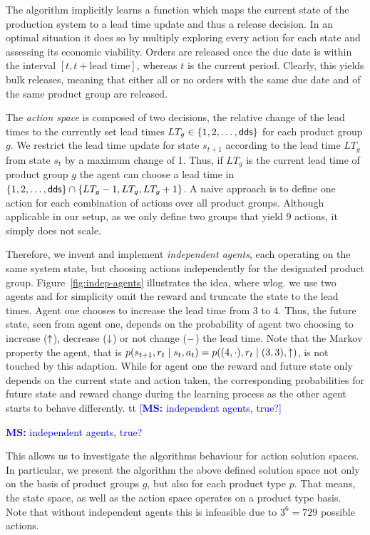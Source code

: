 \documentclass[envcountsame]{llncs}
\newcommand\MS[2][r]{\ifx t#1 \textcolor{blue}{[\textbf{MS:} #2]}
  \else \begin{center}\textcolor{blue}{\textbf{MS:} #2} \end{center} \fi}
\begin{document}
The algorithm implicitly learns a function which maps the current state of the production
system to a lead time update and thus a release decision. In an optimal situation it does so by
multiply exploring every action for each state and assessing its economic viability.
%
Orders are released once the due date is within the interval $[t,t+\text{lead time}]$, whereas $t$
is the current period. Clearly, this yields bulk releases, meaning that either all or no orders with
the same due date and of the same product group are
released.

The \textit{action space} is composed of two decisions, the relative change of the lead times to the
currently set lead times $LT_{g} \in \{1,2,\ldots,\textsf{dds}\}$ for each product group $g$.
%
We restrict the lead time update for state $s_{t+1}$ according to the lead time $LT_{g}$ from state
$s_{t}$ by a maximum change of 1. Thus, if $LT_{g}$ is the current lead time of product group $g$
the agent can choose a lead time in $\{1,2,\ldots,\textsf{dds}\} \cap \{LT_{g}-1,LT_{g},LT_{g}+1\}$. %
A naive approach is to define one action for each combination of actions over all product groups.
Although applicable in our setup, as we only define two groups that yield \(9\) actions, it simply
does not scale.
%
\begin{figure*}[t!]
  \centering
  \caption{Illustration of independent agents as agent one increases the lead time}\label{fig:indep-agents}
\end{figure*}
%
Therefore, we invent and implement \textit{independent agents}, each operating on the same system
state, but choosing actions independently for the designated product group.
Figure~\ref{fig:indep-agents} illustrates the idea, where wlog. we use two agents and for simplicity
omit the reward and truncate the state to the lead times. Agent one chooses to increase the lead
time from \(3\) to \(4\). Thus, the future state, seen from agent one, depends on the probability of
agent two choosing to increase (\(\uparrow\)), decrease (\(\downarrow\)) or not change (\(-\)) the lead
time. Note that the Markov property the agent, that is
\(p(s_{t+1}, r_{t} \mid s_{t}, a_{t}) = p((4,\cdot), r_{t} \mid (3,3), \uparrow) \), is not touched by
this adaption. While for agent one the reward and future state only depends on the current state and
action taken, the corresponding probabilities for future state and reward change during the learning
process as the other agent starts to behave differently.
%
\MS[t]{independent agents, true?}This allows us to investigate the algorithms behaviour for action
solution spaces. In particular, we present the algorithm the above defined solution space not only
on the basis of product groups \(g\), but also for each product type \(p\).
That means, the state space, as well as the action space operates on a product type basis. Note that
without independent agents this is infeasible due to \(3^{6} = 729\) possible actions.
\end{document}

